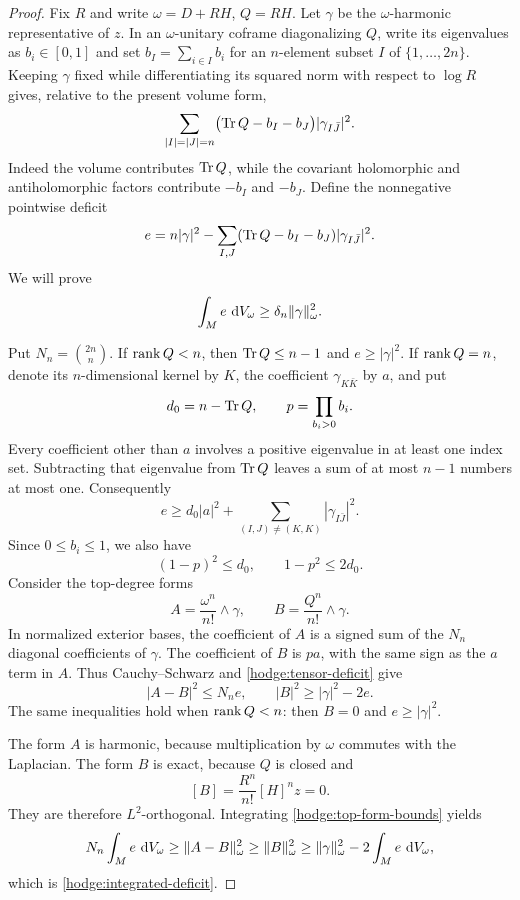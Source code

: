 \begin{proof}
Fix $R$ and write $\omega=D+RH$, $Q=RH$.  Let $\gamma$ be the
$\omega$-harmonic representative of $z$.  In an $\omega$-unitary coframe
diagonalizing $Q$, write its eigenvalues as $b_i\in[0,1]$ and set
$b_I=\sum_{i\in I}b_i$ for an $n$-element subset $I$ of
$\{1,\ldots,2n\}$.  Keeping $\gamma$ fixed while differentiating its
squared norm with respect to $\log R$ gives, relative to the present
volume form,
\begin{equation}\label{hodge:variation}
 \sum_{|I|=|J|=n}
 \bigl(\operatorname{Tr} Q-b_I-b_J\bigr)|\gamma_{I\bar J}|^2.
\end{equation}
Indeed the volume contributes $\operatorname{Tr} Q$, while the covariant holomorphic
and antiholomorphic factors contribute $-b_I$ and $-b_J$.
Define the nonnegative pointwise deficit
\[
 e=n|\gamma|^2-
 \sum_{I,J}(\operatorname{Tr} Q-b_I-b_J)|\gamma_{I\bar J}|^2.
\]
We will prove
\begin{equation}\label{hodge:integrated-deficit}
 \int_M e\,\,\mathrm d V_\omega\ge\delta_n\lVert\gamma\rVert_\omega^2.
\end{equation}

Put $N_n=\binom{2n}{n}$.  If $\operatorname{rank} Q<n$, then $\operatorname{Tr} Q\le n-1$
and $e\ge|\gamma|^2$.  If $\operatorname{rank} Q=n$, denote its $n$-dimensional
kernel by $K$, the coefficient $\gamma_{K\bar K}$ by $a$, and put
\[
 d_0=n-\operatorname{Tr} Q,\qquad p=\prod_{b_i>0}b_i.
\]
Every coefficient other than $a$ involves a positive eigenvalue in at
least one index set.  Subtracting that eigenvalue from $\operatorname{Tr} Q$ leaves a
sum of at most $n-1$ numbers at most one.  Consequently
\begin{equation}\label{hodge:tensor-deficit}
 e\ge d_0|a|^2+\sum_{(I,J)\ne(K,K)}|\gamma_{I\bar J}|^2.
\end{equation}
Since $0\le b_i\le1$, we also have
\[
 (1-p)^2\le d_0,\qquad 1-p^2\le2d_0.
\]
Consider the top-degree forms
\[
 A=\frac{\omega^n}{n!}\wedge\gamma,
 \qquad B=\frac{Q^n}{n!}\wedge\gamma.
\]
In normalized exterior bases, the coefficient of $A$ is a signed sum of
the $N_n$ diagonal coefficients of $\gamma$.  The coefficient of $B$ is
$p a$, with the same sign as the $a$ term in $A$.  Thus
Cauchy--Schwarz and \eqref{hodge:tensor-deficit} give
\begin{equation}\label{hodge:top-form-bounds}
 |A-B|^2\le N_n e,
 \qquad |B|^2\ge |\gamma|^2-2e.
\end{equation}
The same inequalities hold when $\operatorname{rank} Q<n$: then $B=0$ and
$e\ge|\gamma|^2$.

The form $A$ is harmonic, because multiplication by $\omega$ commutes
with the Laplacian.  The form $B$ is exact, because $Q$ is closed and
\[
 [B]=\frac{R^n}{n!}[H]^n z=0.
\]
They are therefore $L^2$-orthogonal.  Integrating
\eqref{hodge:top-form-bounds} yields
\[
 N_n\int_M e\,\,\mathrm d V_\omega
 \ge\lVert A-B\rVert_\omega^2
 \ge\lVert B\rVert_\omega^2
 \ge\lVert\gamma\rVert_\omega^2-2\int_M e\,\,\mathrm d V_\omega,
\]
which is \eqref{hodge:integrated-deficit}.


\end{proof}

